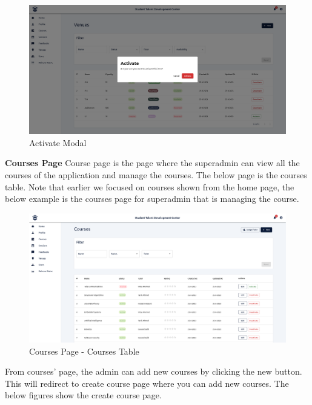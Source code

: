 \begin{justify}
    \begin{figure}[H]
        \centerline{\includegraphics[width=150mm,scale=1]{figures/implementation_and_testing/implementation/frontend/pages/Activate Modal.png}}
        \caption{Activate Modal}
    \end{figure}



    \noindent \textbf{Courses Page}\newendline
    Course page is the page where the superadmin can view all the courses of the application and manage the courses. The below page is the courses table. Note that earlier we focused on courses shown from the home page, the below example is the courses page for superadmin that is managing the course.

    \begin{figure}[H]
        \centerline{\includegraphics[width=150mm,scale=1]{figures/implementation_and_testing/implementation/frontend/pages/Courses - Table.png}}
        \caption{Courses Page - Courses Table}
    \end{figure}

    \vspace{0.25cm}
    \newendline From courses' page, the admin can add new courses by clicking the new button. This will redirect to create course page where you can add new courses. The below figures show the create course page.


\end{justify}

